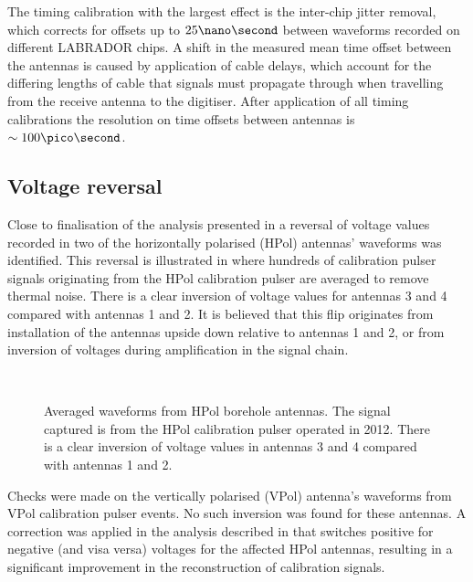 The timing calibration with the largest effect is the inter-chip jitter removal, which corrects for offsets up to $25 \nano \second$ between waveforms recorded on different LABRADOR chips. A shift in the measured mean time offset between the antennas is caused by application of cable delays, which account for the differing lengths of cable that signals must propagate through when travelling from the receive antenna to the digitiser. After application of all timing calibrations the resolution on time offsets between antennas is $\sim 100 \pico \second$.


\subsection{Voltage reversal}
\label{sec:calibration:Voltage-reversal}

Close to finalisation of the analysis presented in  a reversal of voltage values recorded in two of the horizontally polarised (HPol) antennas' waveforms was identified. This reversal is illustrated in  where hundreds of calibration pulser signals originating from the HPol calibration pulser are averaged to remove thermal noise. There is a clear inversion of voltage values for antennas 3 and 4 compared with antennas 1 and 2. It is believed that this flip originates from installation of the antennas upside down relative to antennas 1 and 2, or from inversion of voltages during amplification in the signal chain. 

\begin{figure}[htpb]
  \hfill
  \\
  \hfill
\caption{Averaged waveforms from HPol borehole antennas. The signal captured is from the HPol calibration pulser operated in 2012. There is a clear inversion of voltage values in antennas 3 and 4 compared with antennas 1 and 2.}
\label{fig:calibration:Voltage-Reversal}
\end{figure}


Checks were made on the vertically polarised (VPol) antenna's waveforms from VPol calibration pulser events. No such inversion was found for these antennas. A correction was applied in the analysis described in  that switches positive for negative (and visa versa) voltages for the affected HPol antennas, resulting in a significant improvement in the reconstruction of calibration signals. 

